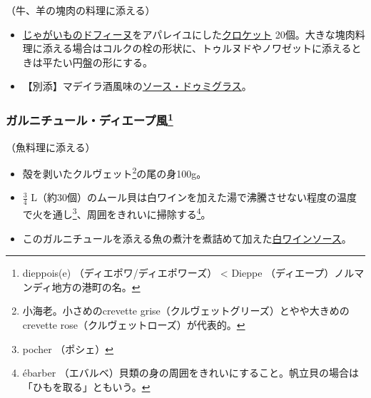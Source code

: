 \begin{recette}


（牛、羊の塊肉の料理に添える）

\begin{itemize}
\item
  \protect\hyperlink{pomme-de-terres-dauphine}{じゃがいものドフィーヌ}をアパレイユにした\protect\hyperlink{croquettes}{クロケット}
  20個。大きな塊肉料理に添える場合はコルクの栓の形状に、トゥルヌドやノワゼットに添えるときは平たい円盤の形にする。
\item
  【別添】マデイラ酒風味の\protect\hyperlink{sauce-demi-glace}{ソース・ドゥミグラス}。
\end{itemize}

\atoaki{}

\hypertarget{garniture-a-la-dieppoise}{%
\subsubsection[ガルニチュール・ディエープ風]{\texorpdfstring{ガルニチュール・ディエープ風\footnote{dieppois(e)
  （ディエポワ/ディエポワーズ） \textless{} Dieppe
  （ディエープ）ノルマンディ地方の港町の名。}}{ガルニチュール・ディエープ風}}\label{garniture-a-la-dieppoise}}



（魚料理に添える）

\begin{itemize}
\item
  殻を剥いたクルヴェット\footnote{小海老。小さめのcrevette
    grise（クルヴェットグリーズ）とやや大きめのcrevette
    rose（クルヴェットローズ）が代表的。}の尾の身100g。
\item
  \(\frac{3}{4}\)
  L（約30個）のムール貝は白ワインを加えた湯で沸騰させない程度の温度で火を通し\footnote{pocher
    （ポシェ）}、周囲をきれいに掃除する\footnote{ébarber
    （エバルベ）貝類の身の周囲をきれいにすること。帆立貝の場合は「ひもを取る」ともいう。}。
\item
  このガルニチュールを添える魚の煮汁を煮詰めて加えた\protect\hyperlink{sauce-vin-blanc}{白ワインソース}。
\end{itemize}


\end{recette}
